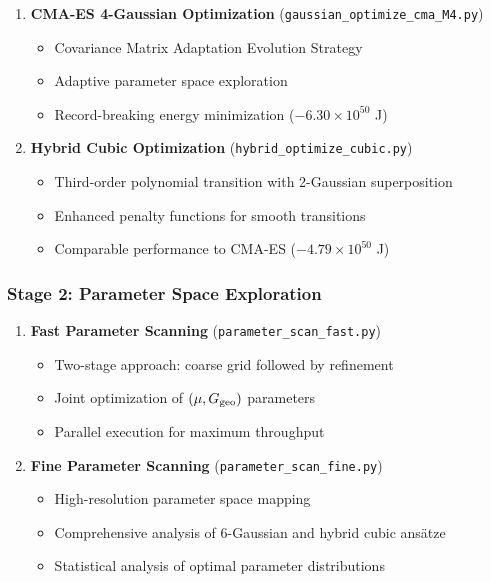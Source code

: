 \documentclass[11pt,a4paper]{article}
\begin{document}
\begin{table}[h]
\begin{table}[h]
\begin{table}[h]
\begin{enumerate}
\item \textbf{CMA-ES 4-Gaussian Optimization} (\texttt{gaussian\_optimize\_cma\_M4.py})
   \begin{itemize}
   \item Covariance Matrix Adaptation Evolution Strategy
   \item Adaptive parameter space exploration
   \item Record-breaking energy minimization ($-6.30 \times 10^{50}$ J)
   \end{itemize}

\item \textbf{Hybrid Cubic Optimization} (\texttt{hybrid\_optimize\_cubic.py})
   \begin{itemize}
   \item Third-order polynomial transition with 2-Gaussian superposition
   \item Enhanced penalty functions for smooth transitions
   \item Comparable performance to CMA-ES ($-4.79 \times 10^{50}$ J)
   \end{itemize}
\end{enumerate}

\subsubsection{Stage 2: Parameter Space Exploration}

\begin{enumerate}
\item \textbf{Fast Parameter Scanning} (\texttt{parameter\_scan\_fast.py})
   \begin{itemize}
   \item Two-stage approach: coarse grid followed by refinement
   \item Joint optimization of $(\mu, G_{\rm geo})$ parameters
   \item Parallel execution for maximum throughput
   \end{itemize}

\item \textbf{Fine Parameter Scanning} (\texttt{parameter\_scan\_fine.py})
   \begin{itemize}
   \item High-resolution parameter space mapping
   \item Comprehensive analysis of 6-Gaussian and hybrid cubic ansätze
   \item Statistical analysis of optimal parameter distributions
   \end{itemize}
\end{enumerate}


\end{table}
\end{table}
\end{table}
\end{document}
